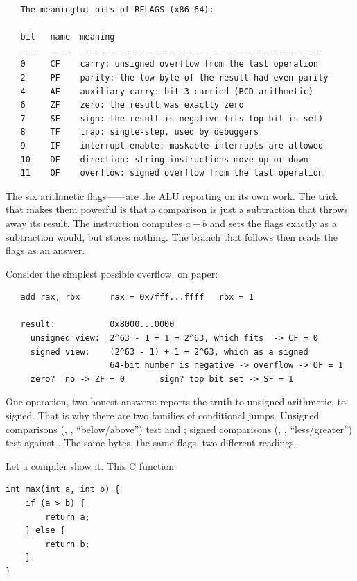 \begin{verbatim}
   The meaningful bits of RFLAGS (x86-64):

   bit   name  meaning
   ---   ----  ------------------------------------------------
   0     CF    carry: unsigned overflow from the last operation
   2     PF    parity: the low byte of the result had even parity
   4     AF    auxiliary carry: bit 3 carried (BCD arithmetic)
   6     ZF    zero: the result was exactly zero
   7     SF    sign: the result is negative (its top bit is set)
   8     TF    trap: single-step, used by debuggers
   9     IF    interrupt enable: maskable interrupts are allowed
   10    DF    direction: string instructions move up or down
   11    OF    overflow: signed overflow from the last operation
\end{verbatim}

The six arithmetic flags------are the
ALU reporting on its own work. The trick that makes them powerful is
that a comparison is just a subtraction that throws away its result.
The instruction  computes $a - b$ and sets the flags
exactly as a subtraction would, but stores nothing. The branch that
follows then reads the flags as an answer.

Consider the simplest possible overflow, on paper:

\begin{verbatim}
   add rax, rbx      rax = 0x7fff...ffff   rbx = 1

   result:           0x8000...0000
     unsigned view:  2^63 - 1 + 1 = 2^63, which fits  -> CF = 0
     signed view:    (2^63 - 1) + 1 = 2^63, which as a signed
                     64-bit number is negative -> overflow -> OF = 1
     zero?  no -> ZF = 0       sign? top bit set -> SF = 1
\end{verbatim}

One operation, two honest answers:  reports the truth to
unsigned arithmetic,  to signed. That is why there are two
families of conditional jumps. Unsigned comparisons (, ,
``below/above'') test  and ; signed comparisons
(, , ``less/greater'') test  against
. The same bytes, the same flags, two different readings.

Let a compiler show it. This C function

\begin{lstlisting}[caption={A branch the compiler will turn into flags.}]
int max(int a, int b) {
    if (a > b) {
        return a;
    } else {
        return b;
    }
}
\end{lstlisting}

